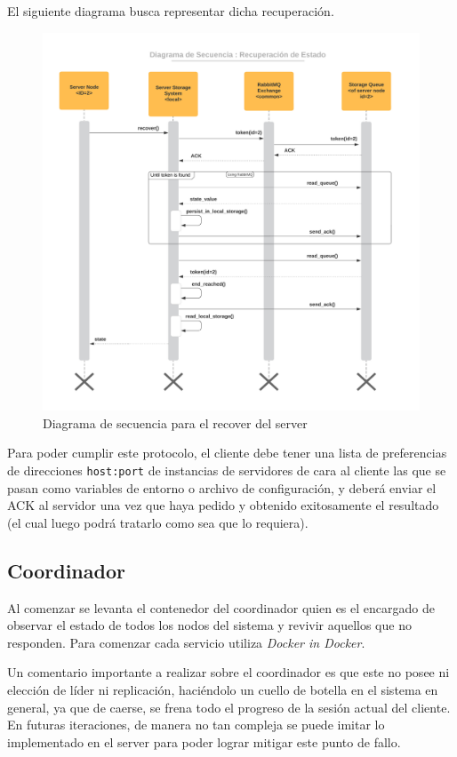 \documentclass[titlepage,a4paper,oneside]{article}
\begin{document}
El siguiente diagrama busca representar dicha recuperación.

\begin{figure}[H]
	\centering
	\includegraphics[width=13cm]{img/sequence_server_storage.jpeg}
	\caption{Diagrama de secuencia para el recover del server}
\end{figure}

Para poder cumplir este protocolo, el cliente debe tener una lista de preferencias de direcciones \texttt{host:port} de instancias de servidores de cara al cliente las que se pasan como variables de entorno o archivo de configuración, y deberá enviar el ACK al servidor una vez que haya pedido y obtenido exitosamente el resultado (el cual luego podrá tratarlo como sea que lo requiera).


\subsection{Coordinador}

Al comenzar se levanta el contenedor del coordinador quien es el encargado de observar el estado de todos los nodos del sistema y revivir aquellos que no responden. Para comenzar cada servicio utiliza \textit{Docker in Docker}.

Un comentario importante a realizar sobre el coordinador es que este no posee ni elección de líder ni replicación, haciéndolo un cuello de botella en el sistema en general, ya que de caerse, se frena todo el progreso de la sesión actual del cliente. En futuras iteraciones, de manera no tan compleja se puede imitar lo implementado en el server para poder lograr mitigar este punto de fallo.
\end{document}
